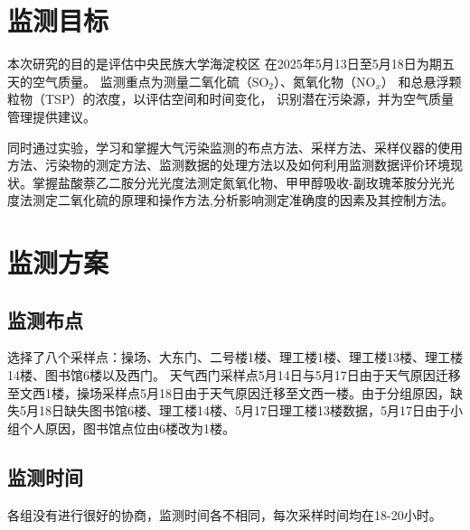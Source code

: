 \documentclass[12pt,hyperref,a4paper,UTF8]{ctexart}
\begin{document}
\cover
%
%

\thispagestyle{empty} %

\newpage
\tableofcontents
\thispagestyle{empty} %

\newpage
\setcounter{page}{1} %


\section{监测目标}
本次研究的目的是评估中央民族大学海淀校区
在2025年5月13日至5月18日为期五天的空气质量。
监测重点为测量二氧化硫（SO$_2$）、氮氧化物（NO$_x$）
和总悬浮颗粒物（TSP）的浓度，以评估空间和时间变化，
识别潜在污染源，并为空气质量管理提供建议。

同时通过实验，学习和掌握大气污染监测的布点方法、采样方法、采样仪器的使用方法、污染物的测定方法、监测数据的处理方法以及如何利用监测数据评价环境现状。掌握盐酸萘乙二胺分光光度法测定氮氧化物、甲甲醇吸收-副玫瑰苯胺分光光度法测定二氧化硫的原理和操作方法,分析影响测定准确度的因素及其控制方法。

\section{监测方案}
\subsection{监测布点}
选择了八个采样点：操场、大东门、二号楼1楼、理工楼1楼、理工楼13楼、理工楼14楼、图书馆6楼以及西门。
天气西门采样点5月14日与5月17日由于天气原因迁移至文西1楼，操场采样点5月18日由于天气原因迁移至文西一楼。由于分组原因，缺失5月18日缺失图书馆6楼、理工楼14楼、5月17日理工楼13楼数据，5月17日由于小组个人原因，图书馆点位由6楼改为1楼。

\subsection{监测时间}
各组没有进行很好的协商，监测时间各不相同，每次采样时间均在18-20小时。
\end{document}
